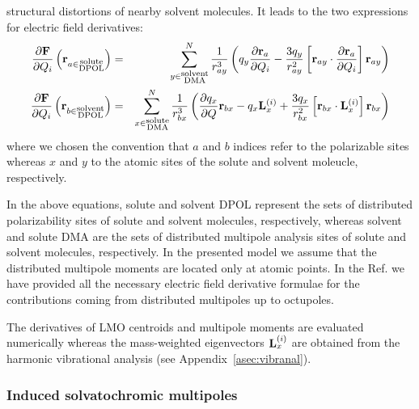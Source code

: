 \documentclass[a4paper,titlepage,twoside,fleqn,12pt]{book}
\newcommand{\fderiv}[2]{\ensuremath{
\frac{\partial #1}{\partial #2}}}
\begin{document}
\begin{refsection}
structural distortions of nearby solvent molecules. 
It leads to the two expressions for electric field derivatives:
%
\begin{eqnarray}
\fderiv{{\bf F}}{Q_i} \left({\bf r}_{a\in\substack{\text{solute}\\\text{DPOL}}} \right)
   &=& \sum_{y\in\substack{\text{solvent}\\\text{DMA}}}^N \frac{1}{r_{ay}^3}  
        \left(
                q_y \fderiv{{\bf r}_{a}}{Q_i} - \frac{3q_y}{r_{ay}^2} 
                \left[ 
                     {\bf r}_{ay} \cdot \fderiv{{\bf r}_{a}}{Q_i} 
                \right] {\bf r}_{ay}
        \right) \\
%
\fderiv{{\bf F}}{Q_i} \left({\bf r}_{b\in\substack{\text{solvent}\\\text{DPOL}}} \right)
    &=& \sum_{x\in\substack{\text{solute}\\\text{DMA}}}^N \frac{1}{r_{bx}^3}  
        \left(
            \fderiv{q_x}{Q}{\bf r}_{bx} - q_x {\bf L}_x^{(i)} + \frac{3q_x}{r_{bx}^2} 
                \left[ 
                     {\bf r}_{bx} \cdot {\bf L}_x^{(i)}
                \right] {\bf r}_{bx}
        \right)
\end{eqnarray}
%
where we chosen the convention that $a$ and $b$ indices refer to the 
polarizable sites whereas $x$ and $y$ to the atomic sites of the solute
and solvent moleucle, respectively.

In the above equations, solute and solvent DPOL represent the sets 
of distributed polarizability sites of solute and solvent molecules, 
respectively, whereas solvent and solute DMA are the sets of distributed 
multipole analysis sites of solute and solvent molecules, respectively. 
In the presented model we assume that the distributed multipole moments are located only at atomic points.
In the Ref.\citep{Blasiak.Cho.JCP.2014} we have provided all the 
necessary electric field derivative formulae for the contributions
coming from distributed multipoles up to octupoles. 

The derivatives of LMO centroids and multipole moments are evaluated numerically whereas 
the mass\hyp{}weighted eigenvectors
${\bf L}_x^{(i)}$ 
are obtained from the harmonic vibrational analysis (see Appendix~\ref{asec:vibranal}).

\subsubsection{Induced solvatochromic multipoles}


\end{refsection}
\end{document}

